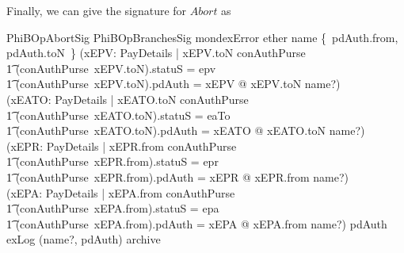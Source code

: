 Finally, we can give the signature for $Abort$ as
%
\begin{LNewSDef}
\begin{schema}{PhiBOpAbortSig}
   PhiBOpBranchesSig
\where
    mondexError \in ether
    \also
    name \in \{~pdAuth.from, pdAuth.toN~\}
    \also
    (\forall xEPV: PayDetails | xEPV.toN \in \dom conAuthPurse \\
         \t1 \land (conAuthPurse~xEPV.toN).statuS = epv \\
         \t1 \land (conAuthPurse~xEPV.toN).pdAuth = xEPV @ xEPV.toN \neq name?) \\
    (\forall xEATO: PayDetails | xEATO.toN \in \dom conAuthPurse \\
         \t1 \land (conAuthPurse~xEATO.toN).statuS = eaTo \\
         \t1 \land (conAuthPurse~xEATO.toN).pdAuth = xEATO @ xEATO.toN \neq name?) \\
    (\forall xEPR: PayDetails | xEPR.from \in \dom conAuthPurse \\
         \t1 \land (conAuthPurse~xEPR.from).statuS = epr \\
         \t1 \land (conAuthPurse~xEPR.from).pdAuth = xEPR @ xEPR.from \neq name?) \\
    (\forall xEPA: PayDetails | xEPA.from \in \dom conAuthPurse \\
         \t1 \land (conAuthPurse~xEPA.from).statuS = epa \\
         \t1 \land (conAuthPurse~xEPA.from).pdAuth = xEPA @ xEPA.from \neq name?)
    \also
    pdAuth \notin exLog \implies (name?, pdAuth) \in archive
    \also

\end{schema}
\end{LNewSDef}
